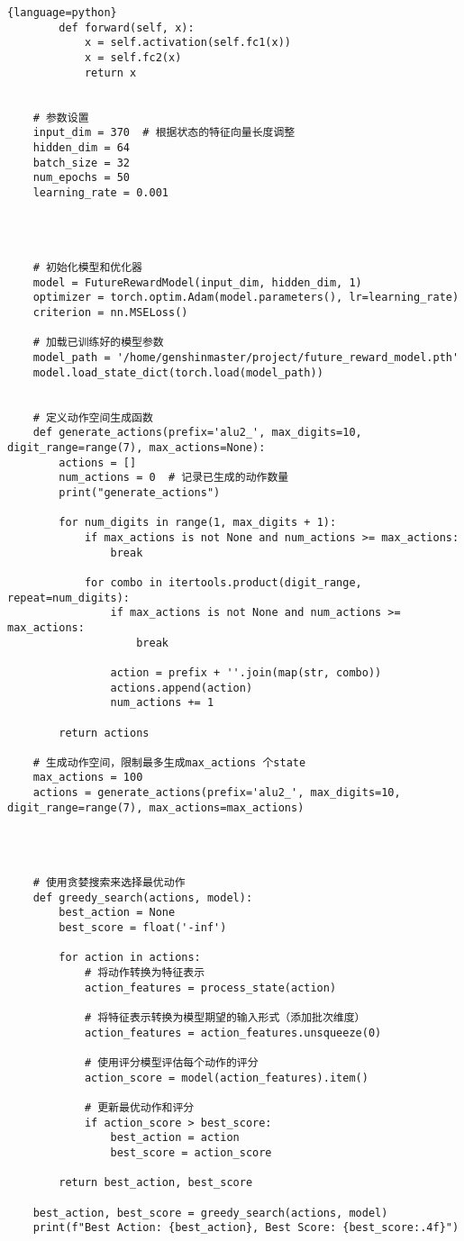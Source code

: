 \documentclass[UTF8]{ctexart}
\begin{document}
\begin{lstlisting}{language=python}
        def forward(self, x):
            x = self.activation(self.fc1(x))
            x = self.fc2(x)
            return x
    
    
    # 参数设置
    input_dim = 370  # 根据状态的特征向量长度调整
    hidden_dim = 64
    batch_size = 32
    num_epochs = 50
    learning_rate = 0.001
    
    
    
    
    # 初始化模型和优化器
    model = FutureRewardModel(input_dim, hidden_dim, 1)
    optimizer = torch.optim.Adam(model.parameters(), lr=learning_rate)
    criterion = nn.MSELoss()
    
    # 加载已训练好的模型参数
    model_path = '/home/genshinmaster/project/future_reward_model.pth'
    model.load_state_dict(torch.load(model_path))
    
    
    # 定义动作空间生成函数
    def generate_actions(prefix='alu2_', max_digits=10, digit_range=range(7), max_actions=None):
        actions = []
        num_actions = 0  # 记录已生成的动作数量
        print("generate_actions")
        
        for num_digits in range(1, max_digits + 1):
            if max_actions is not None and num_actions >= max_actions:
                break
            
            for combo in itertools.product(digit_range, repeat=num_digits):
                if max_actions is not None and num_actions >= max_actions:
                    break
                
                action = prefix + ''.join(map(str, combo))
                actions.append(action)
                num_actions += 1
        
        return actions
    
    # 生成动作空间，限制最多生成max_actions 个state
    max_actions = 100
    actions = generate_actions(prefix='alu2_', max_digits=10, digit_range=range(7), max_actions=max_actions)
    
    
    
    
    # 使用贪婪搜索来选择最优动作
    def greedy_search(actions, model):
        best_action = None
        best_score = float('-inf')
        
        for action in actions:
            # 将动作转换为特征表示
            action_features = process_state(action)
            
            # 将特征表示转换为模型期望的输入形式（添加批次维度）
            action_features = action_features.unsqueeze(0)
            
            # 使用评分模型评估每个动作的评分
            action_score = model(action_features).item()
            
            # 更新最优动作和评分
            if action_score > best_score:
                best_action = action
                best_score = action_score
        
        return best_action, best_score
    
    best_action, best_score = greedy_search(actions, model)
    print(f"Best Action: {best_action}, Best Score: {best_score:.4f}")
\end{lstlisting}
\end{document}
